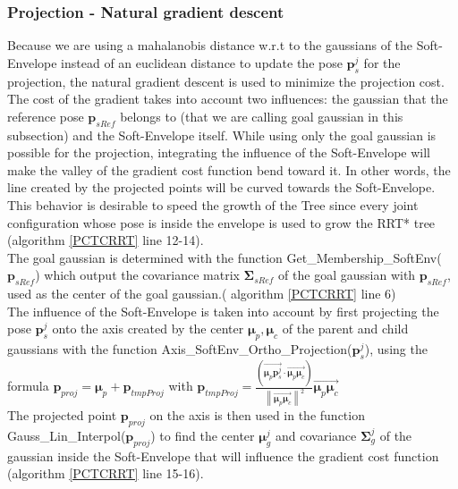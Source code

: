 \documentclass[letterpaper, 10 pt, conference]{ieeeconf}  %
\newcommand{\mb}[1]{{\boldsymbol{#1}}}
\newcommand\norm[1]{\left\lVert#1\right\rVert}
\begin{document}
\subsubsection{Projection - Natural gradient descent}\leavevmode\par

Because we are using a mahalanobis distance w.r.t to the gaussians of the Soft-Envelope instead of an euclidean distance to update the pose $\mb{p}_s^j$ for the projection, the natural gradient descent is used \cite{WhyAdaptiveGrad} to minimize the projection cost. The cost of the gradient takes into account two influences: the gaussian that the reference pose $\mb{p}_{sRef}$ belongs to (that we are calling goal gaussian in this subsection) and the Soft-Envelope itself. While using only the goal gaussian is possible for the projection, integrating the influence of the Soft-Envelope will make the valley of the gradient cost function bend toward it. In other words, the line created by the projected points will be curved towards the Soft-Envelope. This behavior is desirable to speed the growth of the Tree since every joint configuration whose pose is inside the envelope is used to grow the RRT* tree (algorithm \ref{PCTCRRT} line 12-14).\\
The goal gaussian is determined with the function {\selectfont Get\_Membership\_SoftEnv($\mb{p}_{sRef}$)} which output the covariance matrix $\mb{\Sigma}_{sRef}$ of the goal gaussian with $\mb{p}_{sRef}$, used as the center of the goal gaussian.( algorithm \ref{PCTCRRT} line 6)\\
The influence of the Soft-Envelope is taken into account by first projecting the pose $\mb{p}_s^j$ onto the axis created by the center $\mb{\mu}_p, \mb{\mu}_c$ of the parent and child gaussians with the function {\selectfont Axis\_SoftEnv\_Ortho\_Projection($\mb{p}_s^j$)}, using the formula $\mb{p}_{proj} = \mb{\mu}_p + \mb{p}_{tmpProj}$ with $\mb{p}_{tmpProj}=\frac{ (\overrightarrow{\mb{\mu}_p\mb{p}_s^j} \cdot \overrightarrow{\mb{\mu}_p\mb{\mu}_c})}{\norm{\overrightarrow{\mb{\mu}_p\mb{\mu}_c}}^2}\overrightarrow{\mb{\mu}_p\mb{\mu}_c} $ \\
The projected point $\mb{p}_{proj}$ on the axis is then used in the function {\selectfont Gauss\_Lin\_Interpol($\mb{p}_{proj}$)} to find the center $\mb{\mu}_g^j$ and covariance $\mb{\Sigma}_g^j$ of the gaussian inside the Soft-Envelope that will influence the gradient cost function (algorithm \ref{PCTCRRT} line 15-16).\\
\end{document}
